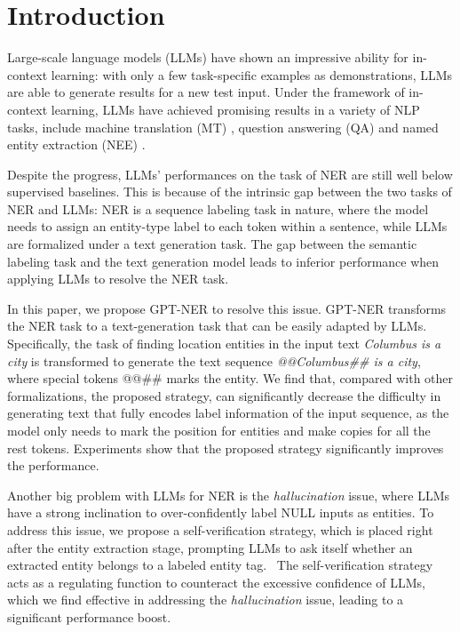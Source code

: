 \documentclass[11pt]{article}
\begin{document}
\section{Introduction}
Large-scale language models (LLMs) \cite{brown2020language,smith2022using,du2022glam,rae2021scaling,thoppilan2022lamda,hoffmann2022training,chowdhery2022palm,touvron2023llama}
have shown an impressive ability for in-context learning:
with only a few task-specific examples as demonstrations, 
LLMs are able to generate results 
for a new test input. 
Under the framework of in-context learning, LLMs have achieved promising results in a variety of 
NLP tasks, include machine translation (MT) \cite{vilar2022prompting,vidal2022automatic,moslem2023adaptive}, question answering (QA) \cite{robinson2022leveraging,li2022self,lazaridou2022internet} and named entity extraction (NEE) \cite{chowdhery2022palm,brown2020language}.

Despite the progress, 
LLMs' performances on the task of NER 
are still well below supervised baselines. 
This is because of the intrinsic gap between the two tasks of  NER and LLMs:
NER is a sequence labeling task in nature, where the model needs to assign an entity-type label to each token within a sentence, while LLMs are formalized under a text generation task. 
The gap between the semantic labeling task and the text generation model leads to inferior performance when applying LLMs to resolve the NER task. 


In this paper, we propose GPT-NER to resolve this issue. 
GPT-NER transforms the NER task 
 to a text-generation task that can be easily adapted by 
  LLMs.
  Specifically, 
  the task of finding location entities in the input text {\it Columbus is a city}
is transformed to generate the text sequence 
\textit{@@Columbus\#\# is a city}, where special tokens @@\#\# marks the entity. 
We find
that, compared with other formalizations, 
 the proposed strategy,  
can  
 significantly decrease the difficulty in 
 generating text that 
   fully encodes label information of the input sequence, as the model only needs to mark the position for 
entities and make copies for all the rest tokens. 
Experiments show that the proposed strategy significantly improves the performance. 

Another big problem with LLMs for NER is 
 the {\it hallucination} issue, where LLMs have a strong inclination to over-confidently label NULL inputs as entities. 
To address this issue, we propose a self-verification strategy, which is placed right after the entity extraction stage,
prompting
 LLMs to 
 ask itself whether an extracted entity belongs to a labeled entity tag. 
  The self-verification strategy acts as a regulating function to counteract the excessive confidence of LLMs, 
  which we find effective in 
  addressing the 
{\it hallucination} issue, leading to a significant performance boost. 
\end{document}
